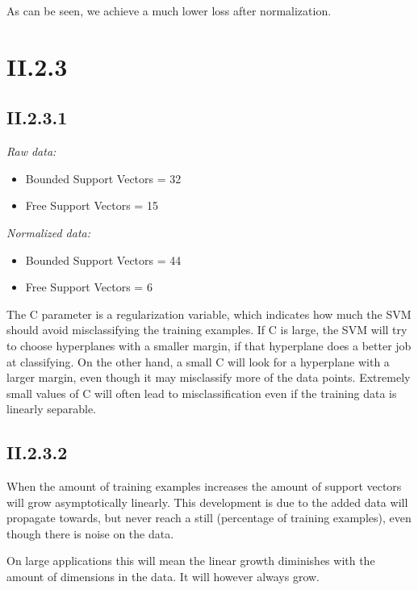 \documentclass[12pt, a4paper]{article}
\begin{document}
As can be seen, we achieve a much lower loss after normalization.

\section*{II.2.3}

\subsection{II.2.3.1}

\textit{Raw data:}
\begin{itemize}
	\item Bounded Support Vectors = 32
	\item Free Support Vectors = 15
\end{itemize}

\textit{Normalized data:}
\begin{itemize}
	\item Bounded Support Vectors = 44
	\item Free Support Vectors = 6
\end{itemize}

The C parameter is a regularization variable, which indicates how much the SVM should avoid misclassifying the training examples. If C is large, the SVM will try to choose hyperplanes with a smaller margin, if that hyperplane does a better job at classifying. On the other hand, a small C will look for a hyperplane with a larger margin, even though it may misclassify more of the data points. Extremely small values of C will often lead to misclassification even if the training data is linearly separable.

\subsection{II.2.3.2}

When the amount of training examples increases the amount of support vectors will grow asymptotically linearly. This development is due to the added data will propagate towards, but never reach a still (percentage of training  examples), even though there is noise on the data.

On large applications this will mean the linear growth diminishes with the amount of dimensions in the data. It will however always grow.
\end{document}
